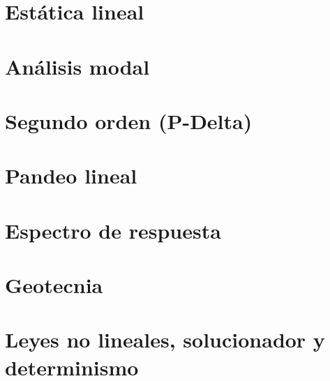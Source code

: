 \chapter{Estática lineal}












\chapter{Análisis modal}




\chapter{Segundo orden (P-Delta)}





\chapter{Pandeo lineal}

\chapter{Espectro de respuesta}


\chapter{Geotecnia}




\chapter{Leyes no lineales, solucionador y determinismo}





